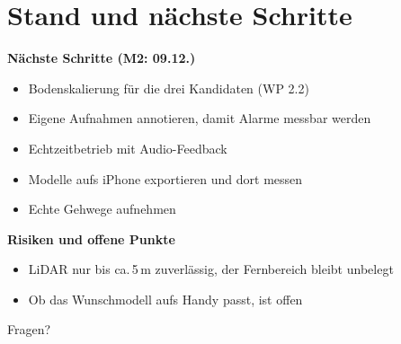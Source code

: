 \documentclass[aspectratio=169]{beamer}
\begin{document}
\section{Stand und nächste Schritte}
\begin{sframe}
  \begin{minipage}[t]{.48\textwidth}
    \vspace{0pt}
    \textbf{Nächste Schritte (M2: 09.12.)}
    \begin{itemize}\setlength\itemsep{2pt}\small
      \item Bodenskalierung für die drei Kandidaten (WP 2.2)
      \item Eigene Aufnahmen annotieren, damit Alarme messbar werden
      \item Echtzeitbetrieb mit Audio-Feedback
      \item Modelle aufs iPhone exportieren und dort messen
      \item Echte Gehwege aufnehmen
    \end{itemize}
  \end{minipage}\hfill
  \begin{minipage}[t]{.48\textwidth}
    \vspace{0pt}
    \textbf{Risiken und offene Punkte}
    \begin{itemize}\setlength\itemsep{2pt}\small
      \item LiDAR nur bis ca.\,5\,m zuverlässig, der Fernbereich bleibt unbelegt
      \item Ob das Wunschmodell aufs Handy passt, ist offen
    \end{itemize}
  \end{minipage}
\end{sframe}

\begin{standoutframe}
  Fragen?
\end{standoutframe}
\end{document}
